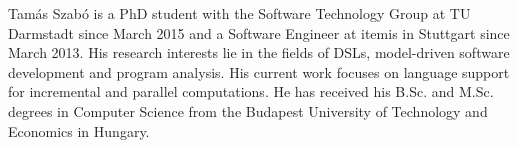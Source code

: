 Tamás Szabó is a PhD student with the Software Technology Group at TU
Darmstadt since March 2015 and a Software Engineer at itemis in Stuttgart since
March 2013. His research interests lie in the fields of DSLs, model-driven
software development and program analysis. His current work focuses on language support for incremental and
parallel computations. He has received his B.Sc. and M.Sc. degrees in
Computer Science from the Budapest University of Technology and Economics in Hungary.
